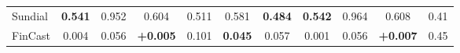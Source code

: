 \begin{tabular}{@{}lcccccccccc@{}}
Sundial & \textbf{\textminus{}0.541} & \textminus{}0.952 & \textminus{}0.604 & \textminus{}0.511 & \textminus{}0.581 & \textbf{\textminus{}0.484} & \textbf{\textminus{}0.542} & \textminus{}0.964 & \textminus{}0.608 & 0.41 \\
FinCast & \textminus{}0.004 & \textminus{}0.056 & \textbf{+0.005} & \textminus{}0.101 & \textbf{\textminus{}0.045} & \textminus{}0.057 & \textminus{}0.001 & \textminus{}0.056 & \textbf{+0.007} & 0.45 \\
\bottomrule
\end{tabular}
